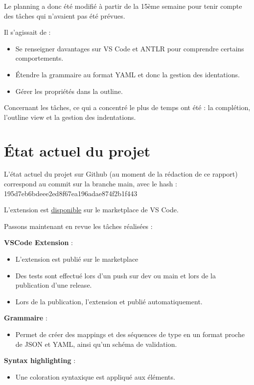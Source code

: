 \documentclass[
    iict, %
    il, %
]{heig-tb}
\begin{document}
Le planning a donc été modifié à partir de la 15ème semaine pour tenir compte des tâches qui n'avaient pas été prévues.

Il s'agissait de :

\begin{itemize}
    \item Se renseigner davantages sur VS Code et ANTLR pour comprendre certains comportements.
    \item Étendre la grammaire au format YAML et donc la gestion des identations.
    \item Gérer les propriétés dans la outline.
\end{itemize}

Concernant les tâches, ce qui a concentré le plus de temps ont été : la complétion, l'outline view et la gestion des indentations.

\section{État actuel du projet}

L'état actuel du projet sur Github (au moment de la rédaction de ce rapport) correspond au commit sur la branche main, avec le hash :
195d7eb6bdeee2ed8f67ea196adae874f2b1f443

L'extension est \href{https://marketplace.visualstudio.com/items?itemName=vitorva.vscode-uon}{disponible} sur le marketplace de VS Code.

Passons maintenant en revue les tâches réalisées :

\textbf{VSCode Extension} :
\begin{itemize}
    \item L'extension est publié sur le marketplace
    \item Des tests sont effectué lors d'un push sur dev ou main et lors de la publication d'une release.
    \item Lors de la publication, l'extension et publié automatiquement.
\end{itemize}

\textbf{Grammaire} :
\begin{itemize}
    \item Permet de créer des mappings et des séquences de type en un format proche de JSON et YAML, ainsi qu'un schéma de validation.
\end{itemize}

\textbf{Syntax highlighting} :
\begin{itemize}
    \item Une coloration syntaxique est appliqué aux éléments.
\end{itemize}
\end{document}
